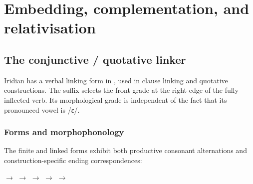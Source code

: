 \chapter{Embedding, complementation, and relativisation}\label{ch:embedding}

\section{The conjunctive / quotative linker}\label{sec:conjunctive-linker}

Iridian has a verbal linking form in , used in clause linking and
quotative constructions. The suffix selects the front grade at the
right edge of the fully inflected verb. Its morphological grade is independent
of the fact that its pronounced vowel is /ɛ/.

\subsection{Forms and morphophonology}

The finite and linked forms exhibit both productive consonant alternations
and construction-specific ending correspondences:

\pex
\a {} $\rightarrow$ 
\a {} $\rightarrow$ 
\a {} $\rightarrow$ 
\a {} $\rightarrow$ 
\a {} $\rightarrow$ 
\xe

